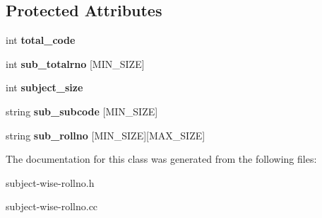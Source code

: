 \subsection*{Protected Attributes}
\begin{DoxyCompactItemize}
\item 
\hypertarget{classSubjectWiseRollNo_aa719b1f10268b6cc741132aced93a321}{int {\bfseries total\-\_\-code}}\label{classSubjectWiseRollNo_aa719b1f10268b6cc741132aced93a321}

\item 
\hypertarget{classSubjectWiseRollNo_a9700a22dff37ac2fd095cbcc3f3e2874}{int {\bfseries sub\-\_\-totalrno} \mbox{[}M\-I\-N\-\_\-\-S\-I\-Z\-E\mbox{]}}\label{classSubjectWiseRollNo_a9700a22dff37ac2fd095cbcc3f3e2874}

\item 
\hypertarget{classSubjectWiseRollNo_a9eef1e17ae0aace37af78b15395ee3e5}{int {\bfseries subject\-\_\-size}}\label{classSubjectWiseRollNo_a9eef1e17ae0aace37af78b15395ee3e5}

\item 
\hypertarget{classSubjectWiseRollNo_a3e21660fe01181bf4595c4fe2163c528}{string {\bfseries sub\-\_\-subcode} \mbox{[}M\-I\-N\-\_\-\-S\-I\-Z\-E\mbox{]}}\label{classSubjectWiseRollNo_a3e21660fe01181bf4595c4fe2163c528}

\item 
\hypertarget{classSubjectWiseRollNo_a20ba02f66c6a634c1f4daeb0bd27b481}{string {\bfseries sub\-\_\-rollno} \mbox{[}M\-I\-N\-\_\-\-S\-I\-Z\-E\mbox{]}\mbox{[}M\-A\-X\-\_\-\-S\-I\-Z\-E\mbox{]}}\label{classSubjectWiseRollNo_a20ba02f66c6a634c1f4daeb0bd27b481}

\end{DoxyCompactItemize}


The documentation for this class was generated from the following files\-:\begin{DoxyCompactItemize}
\item 
subject-\/wise-\/rollno.\-h\item 
subject-\/wise-\/rollno.\-cc\end{DoxyCompactItemize}
